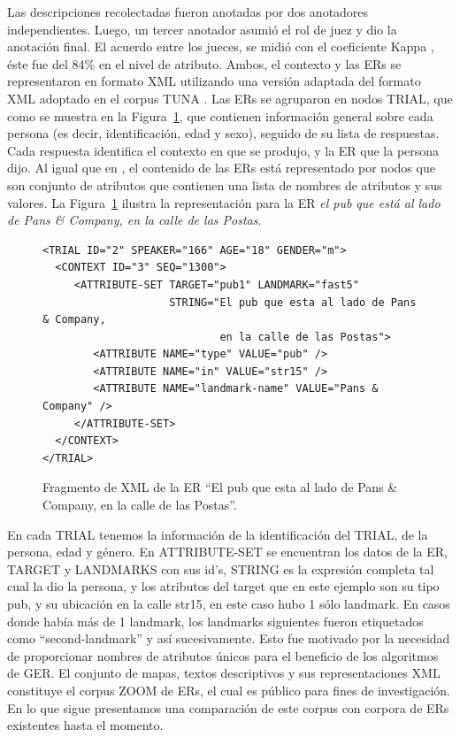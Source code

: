 Las descripciones recolectadas fueron anotadas por dos anotadores independientes. Luego, un tercer anotador asumi\'o el rol de juez y dio la anotaci\'on final. El acuerdo entre los jueces, se midi\'o con el coeficiente Kappa \cite{kappa}, \'este fue del 84\% en el nivel de atributo.
Ambos, el contexto y las ERs se representaron en formato XML utilizando una versi\'on adaptada del formato XML adoptado en el corpus TUNA \cite{tuna-corpus}. Las ERs se agruparon en nodos TRIAL, que como se muestra en la Figura~\ref{xml}, que contienen informaci\'on general sobre cada persona (es decir, identificaci\'on, edad y sexo), seguido de su lista de respuestas. Cada respuesta identifica el contexto en que se produjo, y la ER que la persona dijo.
Al igual que en \cite{tuna-corpus}, el contenido de las ERs est\'a representado por nodos que son conjunto de atributos que contienen una lista de nombres de atributos y sus valores. La Figura~\ref{xml} ilustra la representaci\'on para la ER {\it el pub que est\'a al lado de Pans \& Company, en la
calle de las Postas}.
\begin{figure}
\begin{verbatim}
<TRIAL ID="2" SPEAKER="166" AGE="18" GENDER="m">
  <CONTEXT ID="3" SEQ="1300">
     <ATTRIBUTE-SET TARGET="pub1" LANDMARK="fast5" 
                    STRING="El pub que esta al lado de Pans & Company, 
                            en la calle de las Postas">
        <ATTRIBUTE NAME="type" VALUE="pub" />
        <ATTRIBUTE NAME="in" VALUE="str15" />
        <ATTRIBUTE NAME="landmark-name" VALUE="Pans & Company" />
     </ATTRIBUTE-SET>
  </CONTEXT>
</TRIAL>	
\end{verbatim}
\caption{Fragmento de XML de la ER ``El pub que esta al lado de Pans \& Company, en la calle de las Postas''.}\label{xml}
\end{figure}

En cada TRIAL tenemos la informaci\'on de la identificaci\'on del TRIAL, de la persona, edad y g\'enero. En ATTRIBUTE-SET se encuentran los datos de la ER, TARGET y LANDMARKS con sus id's, STRING es la expresi\'on completa tal cual la dio la persona, y los atributos del target que en este ejemplo son su tipo pub, y su ubicaci\'on en la calle str15, en este caso hubo 1 s\'olo landmark. En casos donde hab\'ia m\'as de 1 landmark, los landmarks siguientes fueron etiquetados como ``second-landmark'' y as\'{i} sucesivamente. Esto fue motivado por la necesidad de proporcionar nombres de atributos \'unicos para el beneficio de los algoritmos de GER.
El conjunto de mapas, textos descriptivos y sus representaciones XML constituye el corpus ZOOM de ERs, el cual es p\'ublico para fines de investigaci\'on.  En lo que sigue presentamos una comparaci\'on de este corpus con corpora de ERs existentes hasta el momento. 

